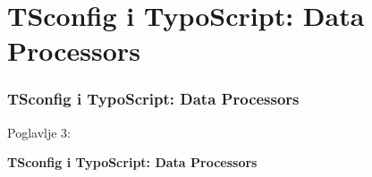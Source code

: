 %

\section{TSconfig i TypoScript: Data Processors}
\begin{frame}[fragile]
	\frametitle{TSconfig i TypoScript: Data Processors}

	\begin{center}\huge{Poglavlje 3:}\end{center}
	\begin{center}\huge{\color{typo3darkgrey}\textbf{TSconfig i TypoScript: Data Processors}}\end{center}

\end{frame}


